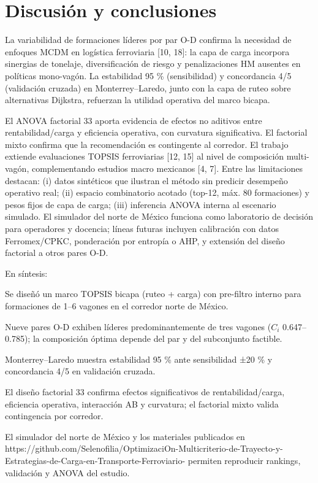 \documentclass[runningheads]{llncs}
\begin{document}
\section{Discusión y conclusiones}
La variabilidad de formaciones líderes por par O-D confirma la necesidad de enfoques MCDM en logística ferroviaria [10, 18]: la capa de carga incorpora sinergias de tonelaje, diversificación de riesgo y penalizaciones HM ausentes en políticas mono-vagón. La estabilidad 95 \% (sensibilidad) y concordancia 4/5 (validación cruzada) en Monterrey–Laredo, junto con la capa de ruteo sobre alternativas Dijkstra, refuerzan la utilidad operativa del marco bicapa.

El ANOVA factorial 33 aporta evidencia de efectos no aditivos entre rentabilidad/carga y eficiencia operativa, con curvatura significativa. El factorial mixto confirma que la recomendación es contingente al corredor. El trabajo extiende evaluaciones TOPSIS ferroviarias [12, 15] al nivel de composición multi-vagón, complementando estudios macro mexicanos [4, 7]. Entre las limitaciones destacan: (i) datos sintéticos que ilustran el método sin predicir desempeño operativo real; (ii) espacio combinatorio acotado (top-12, máx. 80 formaciones) y pesos fijos de capa de carga; (iii) inferencia ANOVA interna al escenario simulado. El simulador del norte de México funciona como laboratorio de decisión para operadores y docencia; líneas futuras incluyen calibración con datos Ferromex/CPKC, ponderación por entropía o AHP, y extensión del diseño factorial a otros pares O-D.

En síntesis:

  \item Se diseñó un marco TOPSIS bicapa (ruteo + carga) con pre-filtro interno para formaciones de 1–6 vagones en el corredor norte de México.
  \item Nueve pares O-D exhiben líderes predominantemente de tres vagones ($C_i$ 0.647–0.785); la composición óptima depende del par y del subconjunto factible.
  \item Monterrey–Laredo muestra estabilidad 95 \% ante sensibilidad ±20 \% y concordancia 4/5 en validación cruzada.
  \item El diseño factorial 33 confirma efectos significativos de rentabilidad/carga, eficiencia operativa, interacción AB y curvatura; el factorial mixto valida contingencia por corredor.
  \item El simulador del norte de México y los materiales publicados en https://github.com/Selenofilia/OptimizaciOn-Multicriterio-de-Trayecto-y-Estrategias-de-Carga-en-Transporte-Ferroviario- permiten reproducir rankings, validación y ANOVA del estudio.
\end{document}
